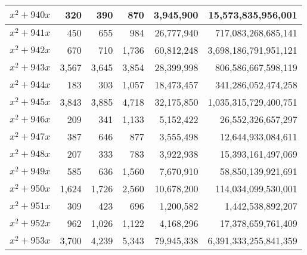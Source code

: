 \documentclass{article}
\begin{document}
\begin{center}
\begin{tabular}{ | c | r | r | r | r | r | }
$x^2 + 940x$ & 320 & 390 & 870 & 3{,}945{,}900 & 15{,}573{,}835{,}956{,}001 \\ \hline
$x^2 + 941x$ & 450 & 655 & 984 & 26{,}777{,}940 & 717{,}083{,}268{,}685{,}141 \\ \hline
$x^2 + 942x$ & 670 & 710 & 1{,}736 & 60{,}812{,}248 & 3{,}698{,}186{,}791{,}951{,}121 \\ \hline
$x^2 + 943x$ & 3{,}567 & 3{,}645 & 3{,}854 & 28{,}399{,}998 & 806{,}586{,}667{,}598{,}119 \\ \hline
$x^2 + 944x$ & 183 & 303 & 1{,}057 & 18{,}473{,}457 & 341{,}286{,}052{,}474{,}258 \\ \hline
$x^2 + 945x$ & 3{,}843 & 3{,}885 & 4{,}718 & 32{,}175{,}850 & 1{,}035{,}315{,}729{,}400{,}751 \\ \hline
$x^2 + 946x$ & 209 & 341 & 1{,}133 & 5{,}152{,}422 & 26{,}552{,}326{,}657{,}297 \\ \hline
$x^2 + 947x$ & 387 & 646 & 877 & 3{,}555{,}498 & 12{,}644{,}933{,}084{,}611 \\ \hline
$x^2 + 948x$ & 207 & 333 & 783 & 3{,}922{,}938 & 15{,}393{,}161{,}497{,}069 \\ \hline
$x^2 + 949x$ & 585 & 636 & 1{,}560 & 7{,}670{,}910 & 58{,}850{,}139{,}921{,}691 \\ \hline
$x^2 + 950x$ & 1{,}624 & 1{,}726 & 2{,}560 & 10{,}678{,}200 & 114{,}034{,}099{,}530{,}001 \\ \hline
$x^2 + 951x$ & 309 & 423 & 696 & 1{,}200{,}582 & 1{,}442{,}538{,}892{,}207 \\ \hline
$x^2 + 952x$ & 962 & 1{,}026 & 1{,}122 & 4{,}168{,}296 & 17{,}378{,}659{,}761{,}409 \\ \hline
$x^2 + 953x$ & 3{,}700 & 4{,}239 & 5{,}343 & 79{,}945{,}338 & 6{,}391{,}333{,}255{,}841{,}359 \\ \hline

\end{tabular}\pagebreak

\begin{tabular}{ | c | r | r | r | r | r | }
\hline


\end{tabular}
\end{center}
\end{document}
